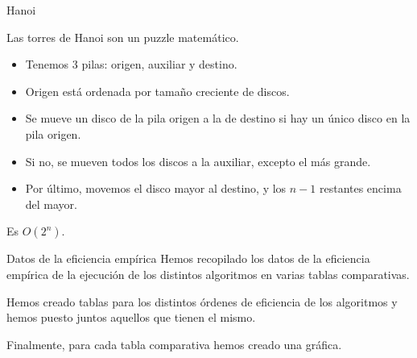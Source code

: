 \documentclass[spanish]{beamer}
\begin{document}
\begin{frame}{Hanoi}

	Las torres de Hanoi son un puzzle matemático.

	\vskip 0.5cm
	
	\begin{itemize}
		\item Tenemos 3 pilas: origen, auxiliar y destino.
		\item Origen está ordenada por tamaño creciente de discos.
		\item Se mueve un disco de la pila origen a la de destino si hay un único disco en la pila origen.
		\item Si no, se mueven todos los discos a la auxiliar, excepto el más grande.
		\item Por último, movemos el disco mayor al destino, y los $n-1$ restantes encima del mayor.
	\end{itemize}
	
	\vskip 0.5cm
	
	Es $O(2^n)$.
\end{frame}

\begin{frame}
	\begin{center}
		
	\end{center}
\end{frame}

\begin{frame}{Datos de la eficiencia empírica}
	Hemos recopilado los datos de la eficiencia empírica de la ejecución de los distintos algoritmos en varias tablas comparativas.
	
	\vskip 0.5cm
	
	Hemos creado tablas para los distintos órdenes de eficiencia de los algoritmos y hemos puesto juntos aquellos que tienen el mismo.
	
	\vskip 0.5cm
	
	Finalmente, para cada tabla comparativa hemos creado una gráfica.
	
\end{frame}


\burbujalinuxOCero
	\seleccionlinuxOCero
	\insercionlinuxOCero
	
	 {\burbujalinuxOCero}
	 {\burbujalinuxOCero}
	 {\burbujalinuxOCero}
\end{document}
